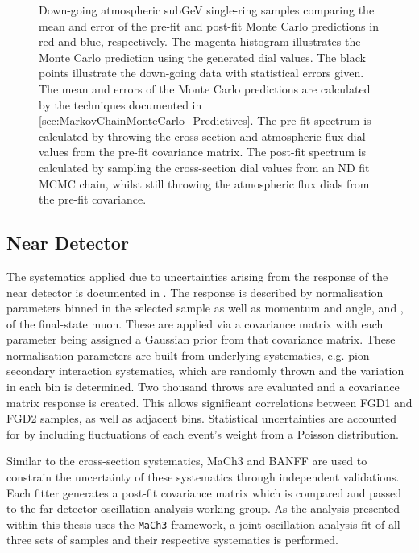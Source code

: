 \begin{figure}[h]
\begin{subfigure}[t]{0.49\textwidth}
  \end{subfigure}
  \caption{Down-going atmospheric subGeV single-ring samples comparing the mean and error of the pre-fit and post-fit Monte Carlo predictions in red and blue, respectively. The magenta histogram illustrates the Monte Carlo prediction using the generated dial values. The black points illustrate the down-going data with statistical errors given. The mean and errors of the Monte Carlo predictions are calculated by the techniques documented in \autoref{sec:MarkovChainMonteCarlo_Predictives}. The pre-fit spectrum is calculated by throwing the cross-section and atmospheric flux dial values from the pre-fit covariance matrix. The post-fit spectrum is calculated by sampling the cross-section dial values from an ND fit MCMC chain, whilst still throwing the atmospheric flux dials from the pre-fit covariance.}
  \label{fig:SelsAndSysts_DownGoingPredictives}
\end{figure}

\subsection{Near Detector}
\label{sec:SelsAndSysts_Systs_ND}

The systematics applied due to uncertainties arising from the response of the near detector is documented in \cite{thesis_clarence}. The response is described by  normalisation parameters binned in the selected sample as well as momentum and angle,  and \quickmath{\cos(\theta_{\mu})}, of the final-state muon. These are applied via a covariance matrix with each parameter being assigned a Gaussian prior from that covariance matrix. These normalisation parameters are built from underlying systematics, e.g. pion secondary interaction systematics, which are randomly thrown and the variation in each  bin is determined. Two thousand throws are evaluated and a covariance matrix response is created. This allows significant correlations between FGD1 and FGD2 samples, as well as adjacent  bins. Statistical uncertainties are accounted for by including fluctuations of each event's weight from a Poisson distribution.

Similar to the cross-section systematics, MaCh3 and BANFF are used to constrain the uncertainty of these systematics through independent validations. Each fitter generates a post-fit covariance matrix which is compared and passed to the far-detector oscillation analysis working group. As the analysis presented within this thesis uses the \texttt{MaCh3} framework, a joint oscillation analysis fit of all three sets of samples and their respective systematics is performed.

